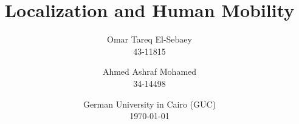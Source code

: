 \documentclass[11pt, a4paper, english]{report}
\title{Localization and Human Mobility}
\author{Omar Tareq El-Sebaey \\ 43-11815 \and Ahmed Ashraf Mohamed \\ 34-14498}
\date{German University in Cairo (GUC) \\ \today}
\begin{document}
    \begin{titlepage}
        \maketitle
        \begin{abstract}
            \textcolor{red}{\blindtext[1]}
        \end{abstract}
        \tableofcontents
    \end{titlepage}
    
    
    
    
\end{document}
